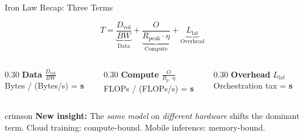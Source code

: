 \documentclass[aspectratio=169, 12pt]{beamer}
\begin{document}
\begin{frame}{Iron Law Recap: Three Terms}
\note{
%
%
%
%
%
}

\footnotesize
$$T = \underbrace{\frac{D_{\text{vol}}}{BW}}_{\text{Data}} + \underbrace{\frac{O}{R_{\text{peak}} \cdot \eta}}_{\text{Compute}} + \underbrace{L_{\text{lat}}}_{\text{Overhead}}$$

\vspace{0.05cm}
\begin{columns}[T]
  \begin{column}{0.30\textwidth}
    \centering
    \textcolor{datastroke}{\textbf{Data}} $\frac{D_{\text{vol}}}{BW}$\\[0.05cm]
    {\scriptsize Bytes / (Bytes/s) = \textbf{s}}
  \end{column}
  \begin{column}{0.30\textwidth}
    \centering
    \textcolor{computestroke}{\textbf{Compute}} $\frac{O}{R_p \cdot \eta}$\\[0.05cm]
    {\scriptsize FLOPs / (FLOPs/s) = \textbf{s}}
  \end{column}
  \begin{column}{0.30\textwidth}
    \centering
    \textcolor{errorstroke}{\textbf{Overhead}} $L_{\text{lat}}$\\[0.05cm]
    {\scriptsize Orchestration tax = \textbf{s}}
  \end{column}
\end{columns}

\vspace{0.1cm}
\begin{mlsyscard}{crimson}
\textbf{New insight:} The \emph{same model} on \emph{different hardware} shifts the dominant term.
Cloud training: compute-bound. Mobile inference: memory-bound.
\end{mlsyscard}

\end{frame}
\end{document}
